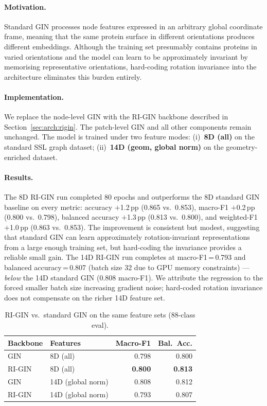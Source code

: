\paragraph{Motivation.}
Standard GIN processes node features expressed in an arbitrary global
coordinate frame, meaning that the same protein surface in different
orientations produces different embeddings.
Although the training set presumably contains proteins in varied orientations
and the model can learn to be approximately invariant by memorising
representative orientations, hard-coding rotation invariance into the
architecture eliminates this burden entirely.

\paragraph{Implementation.}
We replace the node-level GIN with the RI-GIN backbone described in
Section~\ref{sec:arch:rigin}.
The patch-level GIN and all other components remain unchanged.
The model is trained under two feature modes:
(i)~\textbf{8D (all)} on the standard SSL graph dataset;
(ii)~\textbf{14D (geom, global norm)} on the geometry-enriched dataset.

\paragraph{Results.}
The 8D RI-GIN run completed 80 epochs and outperforms the 8D standard GIN
baseline on every metric: accuracy $+$1.2\,pp (0.865 vs.\ 0.853),
macro-F1 $+$0.2\,pp (0.800 vs.\ 0.798), balanced accuracy $+$1.3\,pp
(0.813 vs.\ 0.800), and weighted-F1 $+$1.0\,pp (0.863 vs.\ 0.853).
The improvement is consistent but modest, suggesting that standard GIN can
learn approximately rotation-invariant representations from a large enough
training set, but hard-coding the invariance provides a reliable small gain.
The 14D RI-GIN run completes at macro-F1\,=\,0.793 and balanced
accuracy\,=\,0.807 (batch size 32 due to GPU memory constraints) ---
\emph{below} the 14D standard GIN (0.808 macro-F1).
We attribute the regression to the forced smaller batch size increasing
gradient noise; hard-coded rotation invariance does not compensate on the
richer 14D feature set.

\begin{table}[h]
  \centering
  \caption{RI-GIN vs.\ standard GIN on the same feature sets (88-class eval).}
  \label{tab:rigin}
  \begin{tabular}{llrr}
    \toprule
    \textbf{Backbone} & \textbf{Features} & \textbf{Macro-F1} & \textbf{Bal.\ Acc.} \\
    \midrule
    GIN    & 8D (all)             & 0.798 & 0.800 \\
    RI-GIN & 8D (all)             & \textbf{0.800} & \textbf{0.813} \\
    \midrule
    GIN    & 14D (global norm)    & 0.808 & 0.812 \\
    RI-GIN & 14D (global norm)    & 0.793 & 0.807 \\
    \bottomrule
  \end{tabular}
\end{table}

